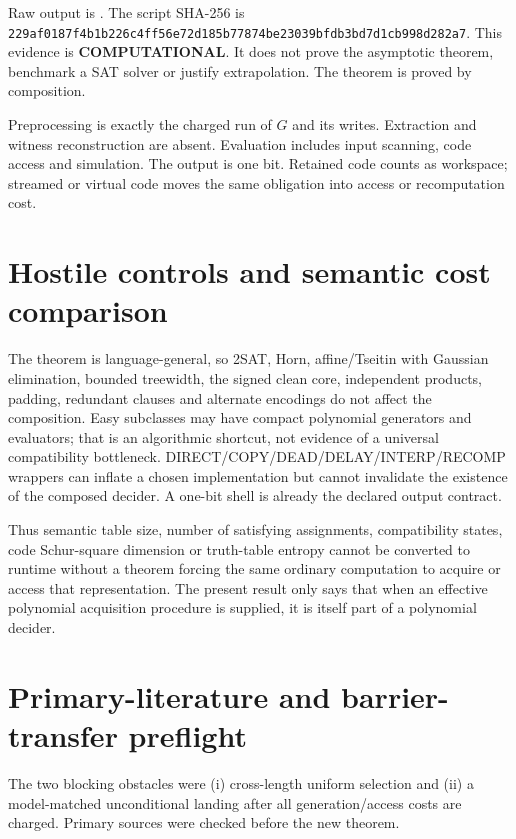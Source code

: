 \documentclass[11pt]{article}
\newcommand{\COMP}{\textbf{COMPUTATIONAL}}
\begin{document}
Raw output is
.
The script SHA-256 is
\texttt{229af0187f4b1b226c4ff56e72d185b77874be23039bfdb3bd7d1cb998d282a7}.
This evidence is \COMP.  It does not prove the asymptotic theorem, benchmark a
SAT solver or justify extrapolation.  The theorem is proved by composition.

Preprocessing is exactly the charged run of \(G\) and its writes.  Extraction
and witness reconstruction are absent.  Evaluation includes input scanning,
code access and simulation.  The output is one bit.  Retained code counts as
workspace; streamed or virtual code moves the same obligation into access or
recomputation cost.

\section{Hostile controls and semantic cost comparison}

The theorem is language-general, so 2SAT, Horn, affine/Tseitin with Gaussian
elimination, bounded treewidth, the signed clean core, independent products,
padding, redundant clauses and alternate encodings do not affect the
composition.  Easy subclasses may have compact polynomial generators and
evaluators; that is an algorithmic shortcut, not evidence of a universal
compatibility bottleneck.  DIRECT/COPY/DEAD/DELAY/INTERP/RECOMP wrappers can
inflate a chosen implementation but cannot invalidate the existence of the
composed decider.  A one-bit shell is already the declared output contract.

Thus semantic table size, number of satisfying assignments, compatibility
states, code Schur-square dimension or truth-table entropy cannot be converted
to runtime without a theorem forcing the same ordinary computation to acquire
or access that representation.  The present result only says that when an
effective polynomial acquisition procedure is supplied, it is itself part of
a polynomial decider.

\section{Primary-literature and barrier-transfer preflight}

The two blocking obstacles were (i) cross-length uniform selection and
(ii) a model-matched unconditional landing after all generation/access costs
are charged.  Primary sources were checked before the new theorem.
\end{document}
